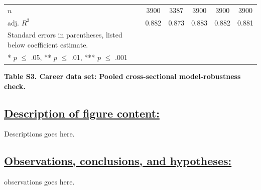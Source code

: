 \documentclass{article}\usepackage[]{graphicx}\usepackage[]{color}
\begin{document}
\begin{table}[h!]
\begin{center}
\begin{tabular}{l c c c c c}
    \hline
    
    \rowcolor{gray!33} 
    $\textit{n}$
    & 3900 & 3387 & 3900 & 3900 & 3900 \\
    
    \rowcolor{gray!33} 
    adj. ${R^2}$ 
    & 0.882 & 0.873 & 0.883 & 0.882 & 0.881 \\
    
    \hline
    \hline
    
    Standard errors in parentheses, listed below coefficient estimate. \\
    {* $\textit{p}$ $\leq$ .05, ** $\textit{p}$ $\leq$ .01, *** $\textit{p}$ $\leq$ .001}
    
  \end{tabular}
  \end{center}
\end{table}
\begin{center}
\par{\textbf{Table S3. Career data set: Pooled cross-sectional model-robustness check.}}
\end{center}
\newpage
\subsection*{\underline{Description of figure content:}}
\par{
Descriptions goes here.
}
\subsection*{\underline{Observations, conclusions, and hypotheses:}}
\par{
observations goes here.
}
\end{document}
